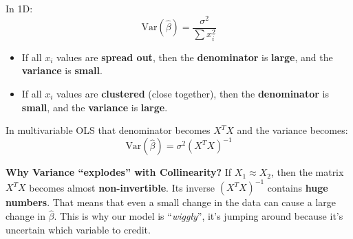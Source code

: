 \highspace
\begin{examplebox}[: Analogy 1D]
    In 1D:
    \begin{equation*}
        \text{Var}(\hat{\beta}) = \dfrac{\sigma^2}{\displaystyle\sum x_i^2}
    \end{equation*}
    \begin{itemize}
        \item If all $x_{i}$ values are \textbf{spread out}, then the \textbf{denominator} is \textbf{large}, and the \textbf{variance} is \textbf{small}.
        \item If all $x_{i}$ values are \textbf{clustered} (close together), then the \textbf{denominator} is \textbf{small}, and the \textbf{variance} is \textbf{large}.
    \end{itemize}
    In multivariable OLS that denominator becomes $X^{T} X$ and the variance becomes:
    \begin{equation*}
        \text{Var}(\hat{\beta}) = \sigma^2 \left(X^{T} X\right)^{-1}
    \end{equation*}
\end{examplebox}

\highspace
\textcolor{Red2}{ \textbf{Why Variance ``explodes'' with Collinearity?}} If $X_1 \approx X_2$, then the matrix $X^{T} X$ becomes almost \textbf{non-invertible}. Its inverse $\left(X^{T} X\right)^{-1}$ contains \textbf{huge numbers}. That means that even a small change in the data can cause a large change in $\hat{\beta}$. This is why our model is ``\emph{wiggly}'', it's jumping around because it's uncertain which variable to credit.

